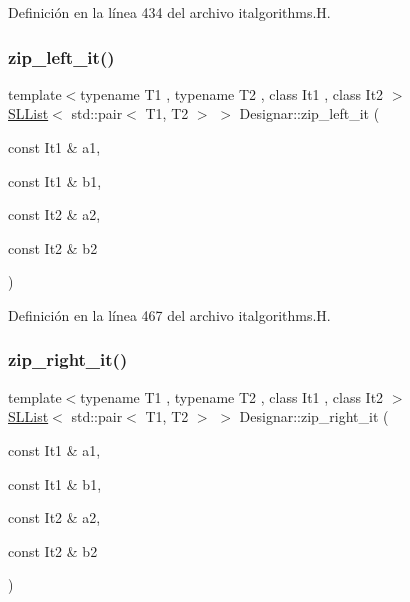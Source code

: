 Definición en la línea 434 del archivo italgorithms.\+H.

\mbox{\label{namespace_designar_aba3b0205f205231f2b7c8df5637b4752}} 
\subsubsection{\texorpdfstring{zip\+\_\+left\+\_\+it()}{zip\_left\_it()}}
{\footnotesize\ttfamily template$<$typename T1 , typename T2 , class It1 , class It2 $>$ \\
\hyperlink{class_designar_1_1_s_l_list}{S\+L\+List}$<$ std\+::pair$<$ T1, T2 $>$ $>$ Designar\+::zip\+\_\+left\+\_\+it (\begin{DoxyParamCaption}\item[{const It1 \&}]{a1,  }\item[{const It1 \&}]{b1,  }\item[{const It2 \&}]{a2,  }\item[{const It2 \&}]{b2 }\end{DoxyParamCaption})}



Definición en la línea 467 del archivo italgorithms.\+H.

\mbox{\label{namespace_designar_a6461340f34943ba69a52a427a97e7140}} 
\subsubsection{\texorpdfstring{zip\+\_\+right\+\_\+it()}{zip\_right\_it()}}
{\footnotesize\ttfamily template$<$typename T1 , typename T2 , class It1 , class It2 $>$ \\
\hyperlink{class_designar_1_1_s_l_list}{S\+L\+List}$<$ std\+::pair$<$ T1, T2 $>$ $>$ Designar\+::zip\+\_\+right\+\_\+it (\begin{DoxyParamCaption}\item[{const It1 \&}]{a1,  }\item[{const It1 \&}]{b1,  }\item[{const It2 \&}]{a2,  }\item[{const It2 \&}]{b2 }\end{DoxyParamCaption})}



